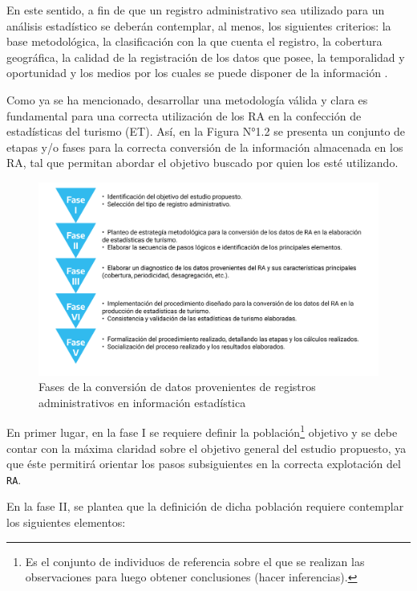 \documentclass[
]{book}
\begin{document}
En este sentido, a fin de que un registro administrativo sea utilizado para un análisis estadístico se deberán contemplar, al menos, los siguientes criterios: la base metodológica, la clasificación con la que cuenta el registro, la cobertura geográfica, la calidad de la registración de los datos que posee, la temporalidad y oportunidad y los medios por los cuales se puede disponer de la información \citep{inegi2006}.

Como ya se ha mencionado, desarrollar una metodología válida y clara es fundamental para una correcta utilización de los RA en la confección de estadísticas del turismo (ET). Así, en la Figura N°1.2 se presenta un conjunto de etapas y/o fases para la correcta conversión de la información almacenada en los RA, tal que permitan abordar el objetivo buscado por quien los esté utilizando.

\begin{figure}

{\centering \includegraphics[width=1\linewidth]{imagenes/figura02} 

}

\caption{Fases de la conversión de datos provenientes de registros administrativos en información estadística}\label{fig:Fases}
\end{figure}

En primer lugar, en la fase I se requiere definir la población\footnote{Es el conjunto de individuos de referencia sobre el que se realizan las observaciones para luego obtener conclusiones (hacer inferencias).} objetivo y se debe contar con la máxima claridad sobre el objetivo general del estudio propuesto, ya que éste permitirá orientar los pasos subsiguientes en la correcta explotación del \texttt{RA}.

En la fase II, se plantea que la definición de dicha población requiere contemplar los siguientes elementos:
\end{document}
